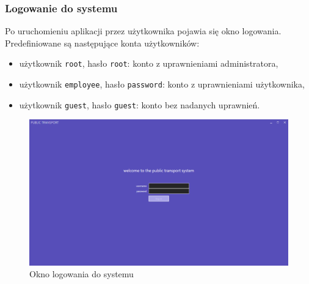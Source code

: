 \documentclass[10pt,a4paper]{article}
\begin{document}
\subsubsection{Logowanie do systemu}
Po uruchomieniu aplikacji przez użytkownika pojawia się okno logowania. Predefiniowane są następujące konta użytkowników:
\begin{itemize}
	\item użytkownik \texttt{root}, hasło \texttt{root}: konto z uprawnieniami administratora,
	\item użytkownik \texttt{employee}, hasło \texttt{password}: konto z uprawnieniami użytkownika,
	\item użytkownik \texttt{guest}, hasło \texttt{guest}: konto bez nadanych uprawnień.
\end{itemize}
\begin{figure}[H]
	\centering
	\includegraphics[width=15cm]{screenshots/01_login_screen.png}
	\caption{Okno logowania do systemu}
\end{figure}
\end{document}

